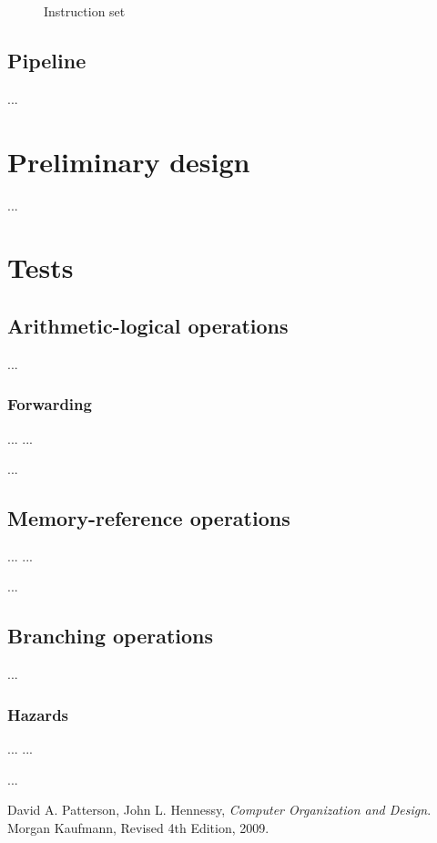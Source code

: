 \documentclass[11pt,twoside,a4paper]{article}
\begin{document}
\begin{figure}[H]
\begin{multicols}{2}
	\end{multicols}
	\caption{Instruction set}
	\label{fig:instruction-set}
\end{figure}

\subsection{Pipeline}
...

\newpage
\pagestyle{fancy}
\section{Preliminary design}
...

\newpage
\pagestyle{fancy}
\section{Tests}

\subsection{Arithmetic-logical operations}
...

\subsubsection{Forwarding}
\begin{multicols}{2}
\noindent ...
\vfill
\columnbreak
...
\lstset{language=[mips]Assembler}

...
\end{multicols}

\subsection{Memory-reference operations}
\begin{multicols}{2}
\noindent ...
\vfill
\columnbreak
...
\lstset{language=[mips]Assembler}

...
\end{multicols}

\subsection{Branching operations}
...

\subsubsection{Hazards}
\begin{multicols}{2}
\noindent ...
\vfill
\columnbreak
...
\lstset{language=[mips]Assembler}

...
\end{multicols}

\newpage
\pagestyle{fancy}
\begin{thebibliography}{9}

  David A. Patterson, John L. Hennessy,
  \emph{Computer Organization and Design}.
  Morgan Kaufmann,
  Revised 4th Edition,
  2009.

\end{thebibliography}
\end{document}
